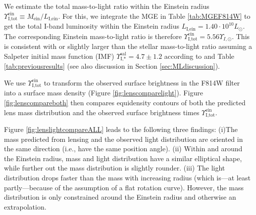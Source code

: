 \documentclass[useAMS,usenatbib]{mnras}
\begin{document}
We estimate the total mass-to-light ratio within the Einstein radius $\Upsilon_\text{I,tot}^\text{ein} \equiv M_\text{ein} / L_\text{I,ein}$. For this, we integrate the MGE in Table \ref{tab:MGEF814W} to get the total I-band luminosity within the Einstein radius $L_\text{I,ein} = 1.40\cdot 10^{10} L_\odot$. The corresponding Einstein mass-to-light ratio is therefore $\Upsilon_\text{I,tot}^\text{ein} = 5.56 \Upsilon_{I,\odot}$. This is consistent with or slightly larger than the stellar mass-to-light ratio assuming a Salpeter initial mass function (IMF) $\Upsilon_\text{I,*}^\text{sal} = 4.7 \pm 1.2$ according to \citet{SWELLSI} and Table \ref{tab:previousresults} (see also discussion in Section \ref{sec:MLdiscussion}).

We use $\Upsilon_\text{I,tot}^\text{ein}$ to transform the observed surface brightness in the F814W filter into a surface mass density (Figure \ref{fig:lenscomparelight}). Figure \ref{fig:lenscompareboth} then compares equidensity contours of both the predicted lens mass distribution and the observed surface brightness times $\Upsilon_\text{I,tot}^\text{ein}$.

Figure \ref{fig:lenslightcompareALL} leads to the following three findings: (i)The mass predicted from lensing and the observed light distribution are oriented in the same direction (i.e., have the same position angle). (ii) Within and around the Einstein radius, mass and light distribution have a similar elliptical shape, while further out the mass distribution is slightly rounder. (iii) The light distribution drops faster than the mass with increasing radius (which is---at least partly---because of the assumption of a flat rotation curve). However, the mass distribution is only constrained around the Einstein radius and otherwise an extrapolation. 
\end{document}
